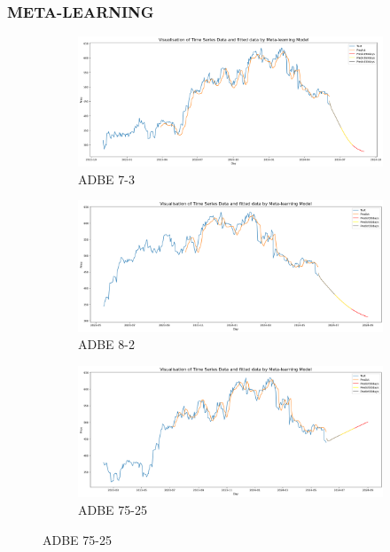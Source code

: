 \documentclass{ieeeojies}
\begin{document}
\subsubsection{META-LEARNING}
\begin{figure}[H]
    \centering
    \begin{subfigure}[b]{0.33\linewidth}
        \centering
        \includegraphics[width=\linewidth]{Meta-learning Plot/ML_ADBE_7_3.png}
        \caption{ADBE 7-3}
        \label{fig:adbe-7-3}
    \end{subfigure}%
    \hfill
    \begin{subfigure}[b]{0.33\linewidth}
        \centering
        \includegraphics[width=\linewidth]{Meta-learning Plot/ML_ADBE_8_2.png}
        \caption{ADBE 8-2}
        \label{fig:adbe-8-2}
    \end{subfigure}%
    \hfill
    \begin{subfigure}[b]{0.33\linewidth}
        \centering
        \includegraphics[width=\linewidth]{Meta-learning Plot/ML_ADBE_75_25.png}
        \caption{ADBE 75-25}
        \label{fig:adbe-75-25}
    \end{subfigure}
\end{figure}
\end{document}
